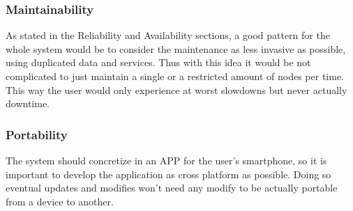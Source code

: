 \subsubsection{Maintainability}
As stated in the Reliability and Availability sections, a good pattern for the whole system would be to consider the maintenance as less invasive as possible, using duplicated data and services.
Thus with this idea it would be not complicated to just maintain a single or a restricted amount of nodes per time. This way the user would only experience at worst slowdowns but never actually downtime.
\subsubsection{Portability}
The system should concretize in an APP for the user's smartphone, so it is important to develop the application as cross platform as possible. Doing so eventual updates and modifies won't need any modify to be actually portable from a device to another.
\clearpage